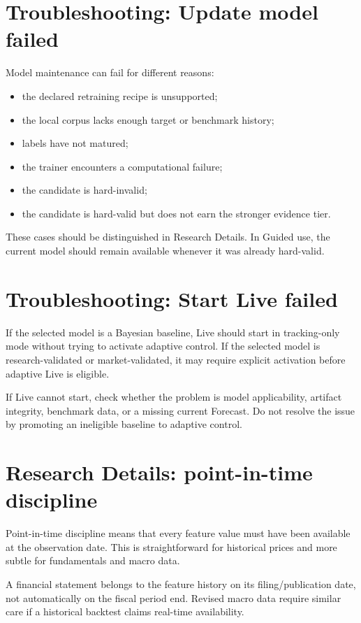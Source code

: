 \documentclass[11pt]{article}
\begin{document}
\section{Troubleshooting: Update model failed}
Model maintenance can fail for different reasons:
\begin{itemize}[itemsep=0.15em]
\item the declared retraining recipe is unsupported;
\item the local corpus lacks enough target or benchmark history;
\item labels have not matured;
\item the trainer encounters a computational failure;
\item the candidate is hard-invalid;
\item the candidate is hard-valid but does not earn the stronger evidence tier.
\end{itemize}

These cases should be distinguished in Research Details. In Guided use, the current model should remain available whenever it was already hard-valid.

\section{Troubleshooting: Start Live failed}
If the selected model is a Bayesian baseline, Live should start in tracking-only mode without trying to activate adaptive control. If the selected model is research-validated or market-validated, it may require explicit activation before adaptive Live is eligible.

If Live cannot start, check whether the problem is model applicability, artifact integrity, benchmark data, or a missing current Forecast. Do not resolve the issue by promoting an ineligible baseline to adaptive control.

\section{Research Details: point-in-time discipline}
Point-in-time discipline means that every feature value must have been available at the observation date. This is straightforward for historical prices and more subtle for fundamentals and macro data.

A financial statement belongs to the feature history on its filing/publication date, not automatically on the fiscal period end. Revised macro data require similar care if a historical backtest claims real-time availability.
\end{document}
